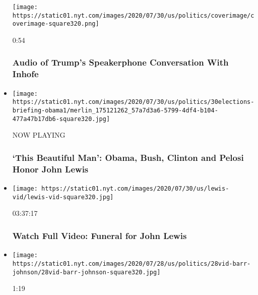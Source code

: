 \begin{itemize}
  \texttt{[image: https://static01.nyt.com/images/2020/07/30/us/politics/coverimage/coverimage-square320.png]}

  0:54

  \hypertarget{audio-of-trumps-speakerphone-conversation-with-inhofe}{%
  \subsubsection{Audio of Trump's Speakerphone Conversation With
  Inhofe}\label{audio-of-trumps-speakerphone-conversation-with-inhofe}}
\item
  \texttt{[image: https://static01.nyt.com/images/2020/07/30/us/politics/30elections-briefing-obama1/merlin\_175121262\_57a7d3a6-5799-4df4-b104-477a47b17db6-square320.jpg]}

  NOW PLAYING

  \hypertarget{this-beautiful-man-obama-bush-clinton-and-pelosi-honor-john-lewis-2}{%
  \subsubsection{`This Beautiful Man': Obama, Bush, Clinton and Pelosi
  Honor John
  Lewis}\label{this-beautiful-man-obama-bush-clinton-and-pelosi-honor-john-lewis-2}}
\item
  \href{https://www.nytimes.com/video/us/politics/100000007264379/john-lewis-funeral.html?action=click\&module=video-series-bar\&region=header\&pgtype=Article\&playlistId=video/us-politics}{}

  \texttt{[image: https://static01.nyt.com/images/2020/07/30/us/lewis-vid/lewis-vid-square320.jpg]}

  03:37:17

  \hypertarget{watch-full-video-funeral-for-john-lewis}{%
  \subsubsection{Watch Full Video: Funeral for John
  Lewis}\label{watch-full-video-funeral-for-john-lewis}}
\item
  \href{https://www.nytimes.com/video/us/politics/100000007261010/barr-johnson-roger-stone-trump.html?action=click\&module=video-series-bar\&region=header\&pgtype=Article\&playlistId=video/us-politics}{}

  \texttt{[image: https://static01.nyt.com/images/2020/07/28/us/politics/28vid-barr-johnson/28vid-barr-johnson-square320.jpg]}

  1:19


\end{itemize}
